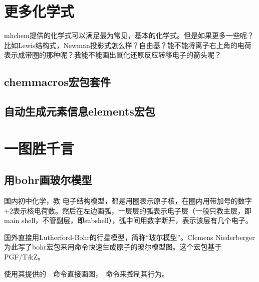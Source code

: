 \documentclass[a4paper,UTF8,zihao = -4]{ctexart} %
\providecommand{\tikzlg}{PGF/T\textit{i}kZ}
\begin{document}
\section{更多化学式}
\label{sec:advanced}

\textsf{mhchem}提供的化学式可以满足最为常见，基本的化学式。但是如果更多一些呢？比如Lewis结构式，Newman投影式怎么样？自由基？能不能将离子右上角的电荷表示成带圈的那种呢？我能不能画出氧化还原反应转移电子的箭头呢？

\subsection{\textsf{chemmacros}宏包套件}
\label{sec:moreSymbEq}

\subsection{自动生成元素信息\textsf{elements}宏包}
\label{sec:elements}


\section{一图胜千言}
\label{sec:graphSketch}




\subsection{用\textsf{bohr}画玻尔模型}
\label{sec:bohr}

国内初中化学，教
电子结构模型，都是用圈表示原子核，在圈内用带加号的数字$+2$表示核电荷数。然后在左边画弧，一层层的弧表示电子层（一般只教主层，即main shell，不管副层，即subshell），弧中间用数字断开，表示该层有几个电子。

国外直接用Lutherford-Bohr的行星模型，简称“玻尔模型”。Clemens Niederberger为此写了\textsf{bohr}宏包来用命令快速生成原子的玻尔模型图。这个宏包基于\tikzlg{}。

\begin{dispListing}
\usepackage{bohr} %
\end{dispListing}

使用其提供的~~命令直接画图，~命令来控制其行为。

\begin{dispExample}
\end{dispExample}
\end{document}
